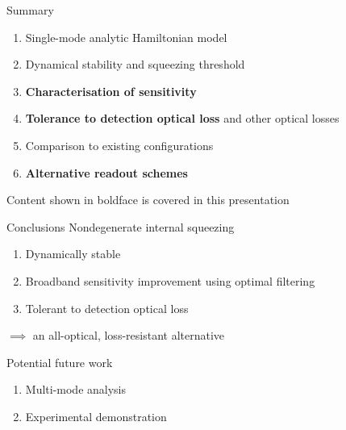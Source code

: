 \documentclass[12pt,xcolor=dvipsnames,aspectratio=169]{beamer}
\newcommand{\vframefill}{\vskip0pt plus 1filll}
\begin{document}
\begin{frame}{Summary}
\begin{enumerate}
\item Single-mode analytic Hamiltonian model
\item Dynamical stability and squeezing threshold %
\item \textbf{Characterisation of sensitivity}
\item \textbf{Tolerance to detection optical loss} and other optical losses
\item Comparison to existing configurations
\item \textbf{Alternative readout schemes}
\end{enumerate}
{\tiny Content shown in boldface is covered in this presentation} 
\end{frame}

\begin{frame}{Conclusions} %
Nondegenerate internal squeezing
\begin{enumerate}
\item Dynamically stable
\item Broadband sensitivity improvement using optimal filtering
\item Tolerant to detection optical loss
\end{enumerate}
$\implies$ an all-optical, loss-resistant alternative %

\vspace*{0.5cm}
Potential future work
\begin{enumerate}
\item Multi-mode analysis
\item Experimental demonstration
\end{enumerate}
\end{frame}

{
\begin{frame}[noframenumbering]
\end{frame}}

\end{document}
